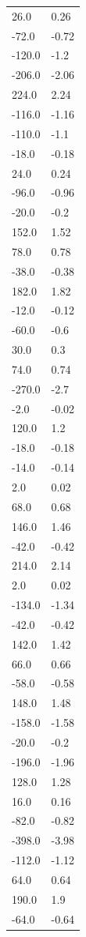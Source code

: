 \begin{longtable}{ll}
26.0 & 0.26 \\
-72.0 & -0.72 \\
-120.0 & -1.2 \\
-206.0 & -2.06 \\
224.0 & 2.24 \\
-116.0 & -1.16 \\
-110.0 & -1.1 \\
-18.0 & -0.18 \\
24.0 & 0.24 \\
-96.0 & -0.96 \\
-20.0 & -0.2 \\
152.0 & 1.52 \\
78.0 & 0.78 \\
-38.0 & -0.38 \\
182.0 & 1.82 \\
-12.0 & -0.12 \\
-60.0 & -0.6 \\
30.0 & 0.3 \\
74.0 & 0.74 \\
-270.0 & -2.7 \\
-2.0 & -0.02 \\
120.0 & 1.2 \\
-18.0 & -0.18 \\
-14.0 & -0.14 \\
2.0 & 0.02 \\
68.0 & 0.68 \\
146.0 & 1.46 \\
-42.0 & -0.42 \\
214.0 & 2.14 \\
2.0 & 0.02 \\
-134.0 & -1.34 \\
-42.0 & -0.42 \\
142.0 & 1.42 \\
66.0 & 0.66 \\
-58.0 & -0.58 \\
148.0 & 1.48 \\
-158.0 & -1.58 \\
-20.0 & -0.2 \\
-196.0 & -1.96 \\
128.0 & 1.28 \\
16.0 & 0.16 \\
-82.0 & -0.82 \\
-398.0 & -3.98 \\
-112.0 & -1.12 \\
64.0 & 0.64 \\
190.0 & 1.9 \\
-64.0 & -0.64 \\

\end{longtable}
